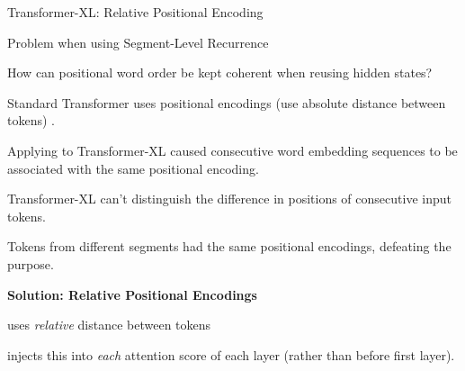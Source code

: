 \begin{frame}{Transformer-XL: Relative Positional Encoding}
    \normalsize\linespread{1.0}

    \begin{alertBlock}{Problem when using Segment-Level Recurrence}
    
        How can positional word order be kept coherent when reusing hidden states?
        
        Standard Transformer uses positional encodings (use absolute distance between tokens) .
    
        \begin{addmargin}{3em}{} %
        \begin{itemizeSpaced}{5pt}
            \largearrowitem Applying to Transformer-XL caused consecutive word embedding sequences to be associated with the same positional encoding.
            
            \largearrowitem Transformer-XL can't distinguish the difference in positions of consecutive input tokens.
            
            \largearrowitem Tokens from different segments had the same positional encodings, defeating the purpose.
        \end{itemizeSpaced}
        \end{addmargin} 
        
        
    \end{alertBlock} 
    
    {\large \textbf{Solution: Relative Positional Encodings}}
    
    \begin{itemizeSpaced}{0pt}
        \item uses \emph{relative} distance between tokens 
        
        \item injects this into \emph{each} attention score of each layer (rather than before first layer).
    \end{itemizeSpaced}

    
\end{frame}




